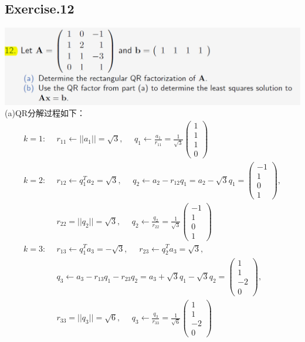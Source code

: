 \documentclass[UTF8,12pt, a4paper]{ctexart}
\begin{document}
\subsection*{Exercise.12}
\includegraphics[scale=0.8]{question12.png}\\
(a)QR分解过程如下：
\begin{align*}
  k=1:\ \  
  &r_{11} \leftarrow ||a_1||=\sqrt{3}, \ \ \ \ \ \  
  q_1 \leftarrow \frac{a_1}{r_{11}} = \frac{1}{\sqrt{3}} 
  \left(
    \begin{matrix}
      1 \\ 1\\ 1\\ 0
    \end{matrix}
  \right) \\
  k=2: 
  &r_{12} \leftarrow q_1^Ta_2=\sqrt{3},\ \ \ \ \ \ 
  q_2\leftarrow a_2-r_{12}q_1 = a_2 - \sqrt{3}q_1 
  =\left(
    \begin{matrix}
      -1 \\ 1 \\ 0 \\ 1
    \end{matrix}
  \right), \\ 
  &r_{22} = ||q_2|| = \sqrt{3},\ \ \ \ \ \ 
  q_2 \leftarrow \frac{q_2}{r_{22}} = \frac{1}{\sqrt{3}}\left(
    \begin{matrix}
      -1 \\ 1 \\ 0 \\ 1
    \end{matrix}
  \right)\\
  k=3: 
  &r_{13} \leftarrow q_1^Ta_3=-\sqrt{3},\ \ \ \ \ \ 
  r_{23} \leftarrow q_2^Ta_3=\sqrt{3},\\ 
  &q_3\leftarrow a_3-r_{13}q_1 - r_{23}q_2 = a_3 + \sqrt{3}q_1 - \sqrt{3}q_2 
  =\left(
    \begin{matrix}
      1 \\ 1 \\ -2 \\ 0
    \end{matrix}
  \right), \\ 
  &r_{33} = ||q_3|| = \sqrt{6},\ \ \ \ \ \ 
  q_3 \leftarrow \frac{q_3}{r_{33}} = \frac{1}{\sqrt{6}}\left(
    \begin{matrix}
      1 \\ 1 \\ -2 \\ 0
    \end{matrix}
  \right)\\
\end{align*}
\end{document}

